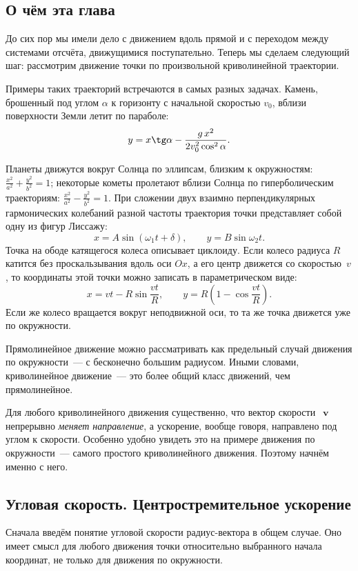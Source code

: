 \documentclass[../main.tex]{subfiles}
\begin{document}
\subsection{О чём эта глава}%

До сих пор мы имели дело с движением вдоль прямой и с переходом
между системами отсчёта, движущимися поступательно. Теперь мы
сделаем следующий шаг: рассмотрим движение точки по произвольной
криволинейной траектории.

Примеры таких траекторий встречаются в самых разных задачах.
Камень, брошенный под углом $\alpha$ к горизонту с начальной скоростью
$v_0$, вблизи поверхности Земли летит по параболе:
\[
y = x\tg\alpha - \frac{g\,x^2}{2v_0^2\cos^2\alpha}.
\]

Планеты движутся вокруг Солнца по эллипсам, близким к окружностям:
$\frac{x^2}{a^2} + \frac{y^2}{b^2} = 1$; некоторые кометы пролетают
вблизи Солнца по гиперболическим траекториям: $\frac{x^2}{a^2} - \frac{y^2}{b^2} = 1$.
При сложении двух взаимно перпендикулярных гармонических колебаний
разной частоты траектория точки представляет собой одну из фигур
Лиссажу:
\[
x = A\sin(\omega_1 t + \delta), \qquad y = B\sin\omega_2 t.
\]
Точка на ободе катящегося колеса описывает циклоиду. Если колесо
радиуса $R$ катится без проскальзывания вдоль оси $Ox$, а его центр
движется со скоростью~$v$, то координаты этой точки можно записать
в параметрическом виде:
\[
x = vt - R\sin\frac{vt}{R}, \qquad
y = R\left(1 - \cos\frac{vt}{R}\right).
\]
Если же колесо вращается вокруг неподвижной оси, то та же точка
движется уже по окружности.

Прямолинейное движение можно рассматривать как предельный случай
движения по окружности~--- с бесконечно большим радиусом.
Иными словами, криволинейное движение~--- это более общий класс
движений, чем прямолинейное.

Для любого криволинейного движения существенно, что вектор скорости~$\mbfv$ непрерывно \textit{меняет направление}, а ускорение, вообще
говоря, направлено под углом к скорости. Особенно удобно увидеть это
на примере движения по окружности~--- самого простого криволинейного
движения. Поэтому начнём именно с него.

\subsection{Угловая скорость. Центростремительное ускорение}
Сначала введём понятие угловой скорости радиус-вектора в общем случае.
Оно имеет смысл для любого движения точки относительно выбранного
начала координат, не только для движения по окружности.
\end{document}
